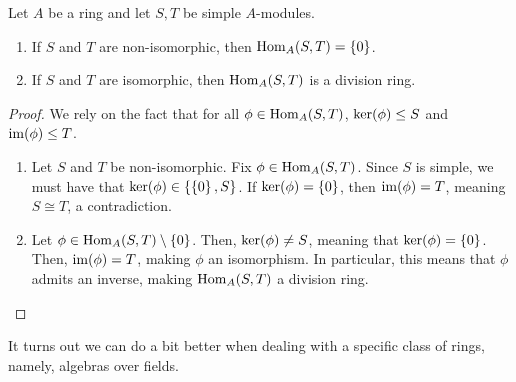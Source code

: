 \begin{theorem}
    Let $A$ be a ring and let $S, T$ be simple $A$-modules.
    \begin{enumerate}[label = \normalfont \arabic*., noitemsep]
        \item If $S$ and $T$ are non-isomorphic, then $\operatorname{Hom}_A(S, T) = \left\{ 0 \right\}$.
        \item If $S$ and $T$ are isomorphic, then $\operatorname{Hom}_A(S,T)$ is a division ring.
    \end{enumerate}
\end{theorem}
\begin{proof}
    We rely on the fact that for all $\phi \in \operatorname{Hom}_A(S, T)$, $\operatorname{ker}\!\left( \phi \right) \leq S$ and $\operatorname{im}\!\left( \phi \right) \leq T$.
    \begin{enumerate}
        \item Let $S$ and $T$ be non-isomorphic. Fix $\phi \in \operatorname{Hom}_A(S,T)$. Since $S$ is simple, we must have that $\operatorname{ker}\!\left( \phi \right) \in \left\{ \left\{ 0 \right\}, S \right\}$. If $\operatorname{ker}\!\left( \phi \right) = \left\{ 0 \right\}$, then $\operatorname{im}\!\left( \phi \right) = T$, meaning $S \cong T$, a contradiction.
        \item Let $\phi \in \operatorname{Hom}_A(S,T) \setminus \left\{ 0 \right\}$. Then, $\operatorname{ker}\!\left( \phi \right) \neq S$, meaning that $\operatorname{ker}\!\left( \phi \right) = \left\{ 0 \right\}$. Then, $\operatorname{im}\!\left( \phi \right) = T$, making $\phi$ an isomorphism. In particular, this means that $\phi$ admits an inverse, making $\operatorname{Hom}_A(S,T)$ a division ring.
    \end{enumerate}
\end{proof}

It turns out we can do a bit better when dealing with a specific class of rings, namely, algebras over fields.


